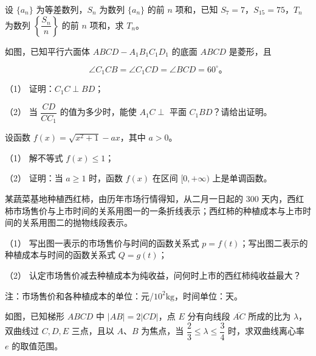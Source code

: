 \begin{question}
设 $\{a_n\}$ 为等差数列，$S_n$ 为数列 $\{a_n\}$ 的前 $n$ 项和，已知 $S_7=7$，$S_{15}=75$，$T_n$ 为数列 $\left\{\dfrac{S_n}{n}\right\}$ 的前 $n$ 项和，求 $T_n$。

\Needspace{0.4\textheight}
\end{question}
\begin{question}
如图，已知平行六面体 $ABCD-A_1B_1C_1D_1$ 的底面 $ABCD$ 是菱形，且

\nopagebreak[4]
\[
\angle C_1CB=\angle C_1CD=\angle BCD=60^\circ\text{。}
\]

（1） 证明：$C_1C\perp BD$；

（2） 当 $\dfrac{CD}{CC_1}$ 的值为多少时，能使 $A_1C\perp$ 平面 $C_1BD$？请给出证明。
\nopagebreak[4]
\begin{center}\end{center}
\nopagebreak[4]
\end{question}
\begin{question}
设函数 $f(x)=\sqrt{x^2+1}-ax$，其中 $a>0$。

（1） 解不等式 $f(x)\le1$；

（2） 证明：当 $a\ge1$ 时，函数 $f(x)$ 在区间 $[0,+\infty)$ 上是单调函数。

\Needspace{0.4\textheight}
\end{question}
\begin{question}
某蔬菜基地种植西红柿，由历年市场行情得知，从二月一日起的 300 天内，西红柿市场售价与上市时间的关系用图一的一条折线表示；西红柿的种植成本与上市时间的关系用图二的抛物线段表示。

（1） 写出图一表示的市场售价与时间的函数关系式 $p=f(t)$；写出图二表示的种植成本与时间的函数关系式 $Q=g(t)$；

（2） 认定市场售价减去种植成本为纯收益，问何时上市的西红柿纯收益最大？

注：市场售价和各种植成本的单位：元/$10^2\mathrm{kg}$，时间单位：天。
\nopagebreak[4]
\begin{center}\end{center}
\nopagebreak[4]
\Needspace{0.4\textheight}
\end{question}
\begin{question}
如图，已知梯形 $ABCD$ 中 $|AB|=2|CD|$，点 $E$ 分有向线段 $\overline{AC}$ 所成的比为 $\lambda$，双曲线过 $C,D,E$ 三点，且以 $A\text{、}B$ 为焦点，当 $\dfrac23\le\lambda\le\dfrac34$ 时，求双曲线离心率 $e$ 的取值范围。
\nopagebreak[4]
\begin{center}\end{center}
\nopagebreak[4]

\end{question}